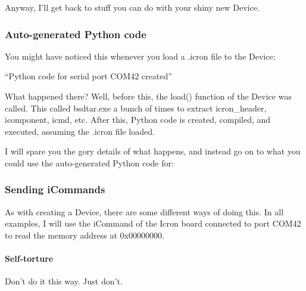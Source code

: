 Anyway, I'll get back to stuff you can do with your shiny new Device.



%
%
\subsubsection{Auto-generated Python code}
\label{3.2.3}

You might have noticed this whenever you load a .icron file to the Device:

\vspace{12pt}
``Python code for serial port COM42 created''
\vspace{12pt}

What happened there? Well, before this, the load() function of the Device was called. This called bsdtar.exe a bunch of times to extract icron\_header, icomponent, icmd, etc. After this, Python code is created, compiled, and executed, assuming the .icron file loaded.

I will spare you the gory details of what happens, and instead go on to what you could use the auto-generated Python code for:



%
%
\subsubsection{Sending iCommands}
\label{3.2.4}

As with creating a Device, there are some different ways of doing this. In all examples, I will use the iCommand of the Icron board connected to port COM42 to read the memory address at 0x00000000.

\setcounter{paragraph}{-1}



%
%
\paragraph{Self-torture}
\label{3.2.4.0}

Don't do it this way. Just don't.

